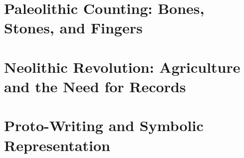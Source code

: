 \section{Paleolithic Counting: Bones, Stones, and Fingers}

\section{Neolithic Revolution: Agriculture and the Need for Records}

\section{Proto-Writing and Symbolic Representation}
